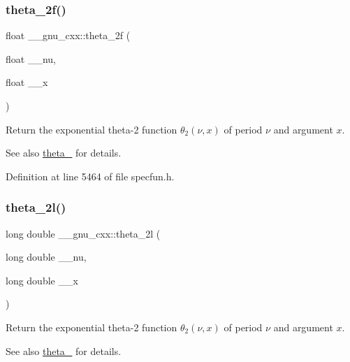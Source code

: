 \subsubsection{\texorpdfstring{theta\+\_\+2f()}{theta\_2f()}}
{\footnotesize\ttfamily float \+\_\+\+\_\+gnu\+\_\+cxx\+::theta\+\_\+2f (\begin{DoxyParamCaption}\item[{float}]{\+\_\+\+\_\+nu,  }\item[{float}]{\+\_\+\+\_\+x }\end{DoxyParamCaption})\hspace{0.3cm}{\ttfamily [inline]}}

Return the exponential theta-\/2 function $ \theta_2(\nu,x) $ of period $ \nu $ and argument $ x $.

\begin{DoxySeeAlso}{See also}
\hyperlink{group__gnu__math__spec__func_ga16f278edeb2842d614bae1f1ae2d0256}{theta\+\_} for details. 
\end{DoxySeeAlso}


Definition at line 5464 of file specfun.\+h.

\mbox{\label{group__gnu__math__spec__func_gac5a30c772d4888442665945e7f3fa017}} 
\subsubsection{\texorpdfstring{theta\+\_\+2l()}{theta\_2l()}}
{\footnotesize\ttfamily long double \+\_\+\+\_\+gnu\+\_\+cxx\+::theta\+\_\+2l (\begin{DoxyParamCaption}\item[{long double}]{\+\_\+\+\_\+nu,  }\item[{long double}]{\+\_\+\+\_\+x }\end{DoxyParamCaption})\hspace{0.3cm}{\ttfamily [inline]}}

Return the exponential theta-\/2 function $ \theta_2(\nu,x) $ of period $ \nu $ and argument $ x $.

\begin{DoxySeeAlso}{See also}
\hyperlink{group__gnu__math__spec__func_ga16f278edeb2842d614bae1f1ae2d0256}{theta\+\_} for details. 
\end{DoxySeeAlso}


